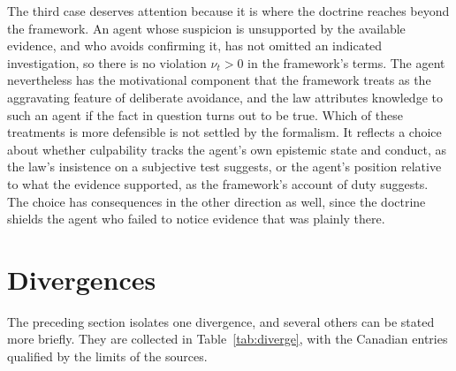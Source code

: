 \documentclass[11pt]{article}
\theoremstyle{plain}
\theoremstyle{definition}
\begin{document}
The third case deserves attention because it is where the doctrine reaches beyond the framework. An agent whose suspicion is unsupported by the available evidence, and who avoids confirming it, has not omitted an indicated investigation, so there is no violation $\nu_t>0$ in the framework's terms. The agent nevertheless has the motivational component that the framework treats as the aggravating feature of deliberate avoidance, and the law attributes knowledge to such an agent if the fact in question turns out to be true. Which of these treatments is more defensible is not settled by the formalism. It reflects a choice about whether culpability tracks the agent's own epistemic state and conduct, as the law's insistence on a subjective test suggests, or the agent's position relative to what the evidence supported, as the framework's account of duty suggests. The choice has consequences in the other direction as well, since the doctrine shields the agent who failed to notice evidence that was plainly there.

\section{Divergences}

The preceding section isolates one divergence, and several others can be stated more briefly. They are collected in Table~\ref{tab:diverge}, with the Canadian entries qualified by the limits of the sources.
\end{document}
